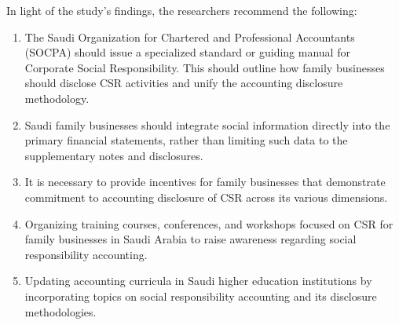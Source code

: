 \documentclass[10pt]{NSP1}
\begin{document}
	In light of the study's findings, the researchers recommend the following:
	\begin{enumerate}
		\item The Saudi Organization for Chartered and Professional Accountants (SOCPA) should issue a specialized standard or guiding manual for Corporate Social Responsibility. This should outline how family businesses should disclose CSR activities and unify the accounting disclosure methodology.
		\item Saudi family businesses should integrate social information directly into the primary financial statements, rather than limiting such data to the supplementary notes and disclosures.
		\item It is necessary to provide incentives for family businesses that demonstrate commitment to accounting disclosure of CSR across its various dimensions.
		\item Organizing training courses, conferences, and workshops focused on CSR for family businesses in Saudi Arabia to raise awareness regarding social responsibility accounting.
		\item Updating accounting curricula in Saudi higher education institutions by incorporating topics on social responsibility accounting and its disclosure methodologies.
	\end{enumerate}
	
\end{document}
